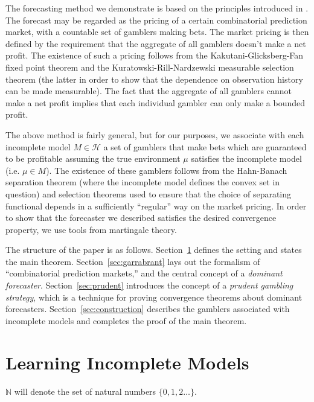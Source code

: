 \documentclass[11pt]{article}
\theoremstyle{definition}
\theoremstyle{plain}
\newcommand{\Nats}{\mathbb{N}}
\newcommand{\MC}{\mathcal{H}}
\begin{document}
The forecasting method we demonstrate is based on the principles introduced in \cite{Garrabrant_2016}. The forecast may be regarded as the pricing of a certain combinatorial prediction market, with a countable set of gamblers making bets. The market pricing is then defined by the requirement that the aggregate of all gamblers doesn't make a net profit. The existence of such a pricing follows from the Kakutani-Glicksberg-Fan fixed point theorem and the Kuratowski-Rill-Nardzewski measurable selection theorem (the latter in order to show that the dependence on observation history can be made measurable). The fact that the aggregate of all gamblers cannot make a net profit implies that each individual gambler can only make a bounded profit.

The above method is fairly general, but for our purposes, we associate with each incomplete model $M \in \MC$ a set of gamblers that make bets which are guaranteed to be profitable assuming the true environment $\mu$ satisfies the incomplete model (i.e. $\mu \in M$). The existence of these gamblers follows from the Hahn-Banach separation theorem (where the incomplete model defines the convex set in question) and selection theorems used to ensure that the choice of separating functional depends in a sufficiently \enquote{regular} way on the market pricing. In order to show that the forecaster we described satisfies the desired convergence property, we use tools from martingale theory.

The structure of the paper is as follows. Section~\ref{sec:learning} defines the setting and states the main theorem. Section~\ref{sec:garrabrant} lays out the formalism of \enquote{combinatorial prediction markets,} and the central concept of a \emph{dominant forecaster}. Section~\ref{sec:prudent} introduces the concept of a \emph{prudent gambling strategy}, which is a technique for proving convergence theorems about dominant forecasters. Section~\ref{sec:construction} describes the gamblers associated with incomplete models and completes the proof of the main theorem.

\section{Learning Incomplete Models}
\label{sec:learning}

$\Nats$ will denote the set of natural numbers $\{0, 1, 2 \ldots\}$.
\end{document}
